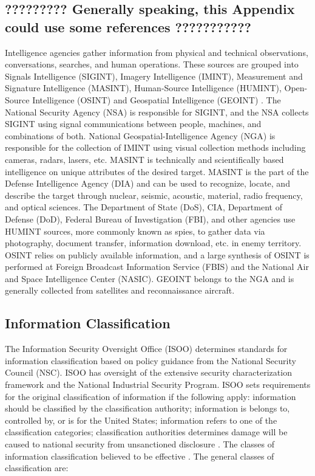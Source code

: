\documentclass{report}
\begin{document}
\subsection{?????????  Generally speaking, this Appendix could use some references ???????????}

Intelligence agencies gather information from physical and technical observations, conversations, searches, and human operations. These sources are grouped into Signals Intelligence (SIGINT), Imagery Intelligence (IMINT), Measurement and Signature Intelligence (MASINT), Human-Source Intelligence (HUMINT), Open-Source Intelligence (OSINT) and Geospatial Intelligence (GEOINT) \cite{Intelligen}. The National Security Agency (NSA) is responsible for SIGINT, and the NSA collects SIGINT using signal communications between people, machines, and combinations of both. National Geospatial-Intelligence Agency (NGA) is responsible for the collection of IMINT using visual collection methods including cameras, radars, lasers, etc. MASINT is technically and scientifically based intelligence on unique attributes of the desired target. MASINT is the part of the Defense Intelligence Agency (DIA) and can be used to recognize, locate, and describe the target through nuclear, seismic, acoustic, material, radio frequency, and optical sciences. The Department of State (DoS), CIA, Department of Defense (DoD), Federal Bureau of Investigation (FBI), and other agencies use HUMINT sources, more commonly known as spies, to gather data via photography, document transfer, information download, etc. in enemy territory. OSINT relies on publicly available information, and a large synthesis of OSINT is performed at Foreign Broadcast Information Service (FBIS) and the National Air and Space Intelligence Center (NASIC). GEOINT belongs to the NGA and is generally collected from satellites and reconnaissance aircraft. 

\subsection{Information Classification}

The Information Security Oversight Office (ISOO) determines standards for information classification based on policy guidance from the National Security Council (NSC). ISOO has oversight of the extensive security characterization framework and the National Industrial Security Program. ISOO sets requirements for the original classification of information if the following apply: information should be classified by the classification authority; information is belongs to, controlled by, or is for the United States; information refers to one of the classification categories; classification authorities determines damage will be caused to national security from unsanctioned disclosure \cite{Office2010}. The classes of information classification believed to be effective \cite{Richelson2011,Office2010}.  The general classes of classification are:
\end{document}
